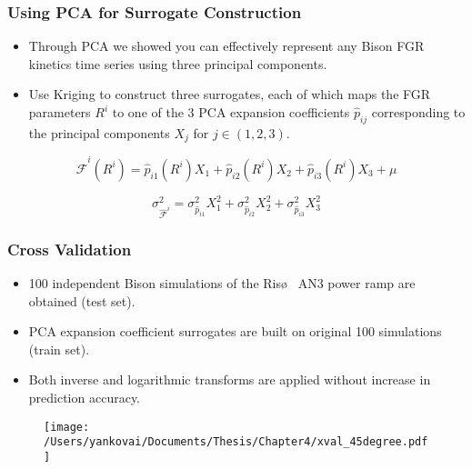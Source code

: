 \begin{frame}
\frametitle{Using PCA for Surrogate Construction}

\begin{itemize}
  \item Through PCA we showed you can effectively represent any Bison FGR kinetics time series using three principal components.
  \item Use Kriging to construct three surrogates, each of which maps the FGR parameters $R^i$ to one of the 3 PCA expansion coefficients $\hat{p}_{ij}$ corresponding to the principal components $X_j$ for $j\in\left(1,2,3\right)$.
\end{itemize}

\begin{equation}
 \hat{\mathcal{F}}^{i}(R^i) = \hat{p}_{i1}\left(R^i\right) X_1 + \hat{p}_{i2}\left(R^i\right) X_2 + \hat{p}_{i3}\left(R^i\right) X_3 + \mu \nonumber  
\end{equation}

\begin{equation}
 \sigma_{ \hat{\mathcal{F}}^i }^2 = \sigma_{\hat{p}_{i1}}^2 X_1^2 + \sigma_{\hat{p}_{i2}}^2 X_2^2 + \sigma_{\hat{p}_{i3}}^2 X_3^2  \nonumber
\end{equation}

\end{frame}
\begin{frame}
\frametitle{Cross Validation}

\begin{itemize}
  \item 100 independent Bison simulations of the Ris\o~ AN3 power ramp are obtained (test set).
  \item PCA expansion coefficient surrogates are built on original 100 simulations (train set). 
  \item Both inverse and logarithmic transforms are applied without increase in prediction accuracy.
\end{itemize}

\begin{figure}
  \texttt{[image: /Users/yankovai/Documents/Thesis/Chapter4/xval\_45degree.pdf]}
\end{figure}

\end{frame}
